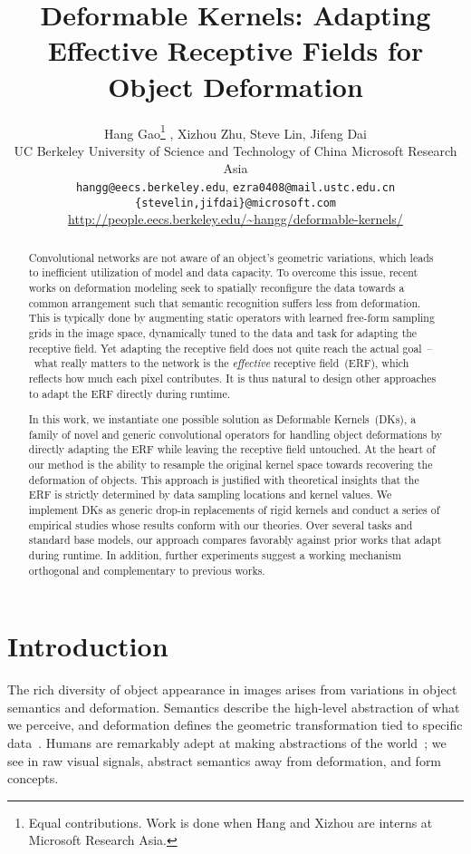\documentclass{article} \usepackage{iclr2020_conference, times}
\title{Deformable Kernels: Adapting Effective Receptive Fields for Object Deformation}
\author{
Hang Gao\thanks{
        Equal contributions. Work is done when Hang and Xizhou are interns at
        Microsoft Research Asia.
    } ,
    Xizhou Zhu\footnotemark[1] ,
    Steve Lin,
    Jifeng Dai \\
    UC Berkeley
    University of Science and Technology of China
    Microsoft Research Asia \\
    \footnotesize{\texttt{hangg@eecs.berkeley.edu}, \texttt{ezra0408@mail.ustc.edu.cn}} \\
    \footnotesize{\texttt{\{stevelin,jifdai\}@microsoft.com}} \\
    \footnotesize{
        {
            \color{magenta}
            \url{http://people.eecs.berkeley.edu/\~hangg/deformable-kernels/}
        }
    }
}
\begin{document}
\maketitle

\begin{abstract}
Convolutional networks are not aware of an object's geometric variations, which leads to inefficient utilization of model and data capacity.
To overcome this issue, recent works on deformation modeling seek to spatially reconfigure the data towards a common arrangement such that semantic recognition suffers less from deformation.
This is typically done by augmenting static operators with learned free-form sampling grids in the image space, dynamically tuned to the data and task for adapting the receptive field.
Yet adapting the receptive field does not quite reach the actual goal~--~what really matters to the network is the \textit{effective} receptive field~(ERF), which reflects how much each pixel contributes.
It is thus natural to design other approaches to adapt the ERF directly during runtime.

In this work, we instantiate one possible solution as Deformable Kernels~(DKs), a family of novel and generic convolutional operators for handling object deformations by directly adapting the ERF while leaving the receptive field untouched.
At the heart of our method is the ability to resample the original kernel space towards recovering the deformation of objects.
This approach is justified with theoretical insights that the ERF is strictly determined by data sampling locations and kernel values.
We implement DKs as generic drop-in replacements of rigid kernels and conduct a series of empirical studies whose results conform with our theories.
Over several tasks and standard base models, our approach compares favorably against prior works that adapt during runtime.
In addition, further experiments suggest a working mechanism orthogonal and complementary to previous works.
\end{abstract}

\section{Introduction}

The rich diversity of object appearance in images arises from variations in object semantics and deformation.
Semantics describe the high-level abstraction of what we perceive, and
deformation defines the geometric transformation tied to specific
data~\citep{gibson1950perception}.
Humans are remarkably adept at making abstractions of the
world~\citep{hudson2019learning}; we see in raw visual signals, abstract
semantics away from deformation, and form concepts.
\end{document}
